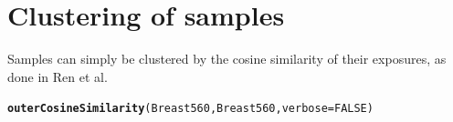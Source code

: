 \documentclass{article}\usepackage[]{graphicx}\usepackage[]{color}
\makeatletter
\newcommand{\hlnum}[1]{\textcolor[rgb]{0.686,0.059,0.569}{#1}}%
\newcommand{\hlstd}[1]{\textcolor[rgb]{0.345,0.345,0.345}{#1}}%
\newcommand{\hlkwc}[1]{\textcolor[rgb]{0.333,0.667,0.333}{#1}}%
\newcommand{\hlkwd}[1]{\textcolor[rgb]{0.737,0.353,0.396}{\textbf{#1}}}%
\newenvironment{kframe}{%
 \def\at@end@of@kframe{}%
 \ifinner\ifhmode%
  \def\at@end@of@kframe{\end{minipage}}%
  \begin{minipage}{\columnwidth}%
 \fi\fi%
 \def\FrameCommand##1{\hskip\@totalleftmargin \hskip-\fboxsep
 \colorbox{shadecolor}{##1}\hskip-\fboxsep
     \hskip-\linewidth \hskip-\@totalleftmargin \hskip\columnwidth}%
 \MakeFramed {\advance\hsize-\width
   \@totalleftmargin\z@ \linewidth\hsize
   \@setminipage}}%
 {\par\unskip\endMakeFramed%
 \at@end@of@kframe}
\newenvironment{knitrout}{}{} %
\makeatother
\begin{document}
\section{Clustering of samples}
Samples can simply be clustered by the cosine similarity of their exposures, as done in Ren et al.

\begin{knitrout}
\color{fgcolor}\begin{kframe}
\begin{alltt}
\hlkwd{outerCosineSimilarity}\hlstd{(Breast560, Breast560,} \hlkwc{verbose}\hlstd{=}\hlnum{FALSE}\hlstd{)}
\end{alltt}


{\ttfamily\noindent\bfseries\color{errorcolor}{\#\# Error in outerCosineSimilarity(Breast560, Breast560, verbose = FALSE): unused argument (verbose = FALSE)}}\end{kframe}
\end{knitrout}

\clearpage

\clearpage
\printbibliography

\clearpage
\end{document}
